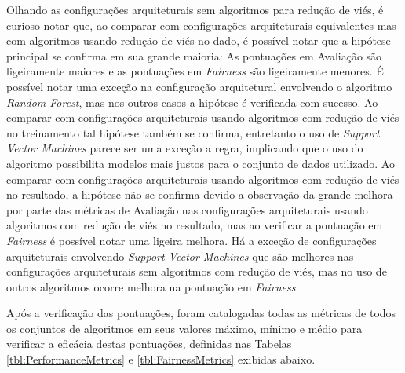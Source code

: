 \documentclass[portugues]{ic-tese}
\begin{document}
Olhando as configurações arquiteturais sem algoritmos para redução de viés, é curioso notar que, ao comparar com configurações arquiteturais equivalentes mas com algoritmos usando redução de viés no dado, é possível notar que a hipótese principal se confirma em sua grande maioria: As pontuações em Avaliação são ligeiramente maiores e as pontuações em \textit{Fairness} são ligeiramente menores. É possível notar uma exceção na configuração arquitetural envolvendo o algoritmo \textit{Random Forest}, mas nos outros casos a hipótese é verificada com sucesso. Ao comparar com configurações arquiteturais usando algoritmos com redução de viés no treinamento tal hipótese também se confirma, entretanto o uso de \textit{Support Vector Machines} parece ser uma exceção a regra, implicando que o uso do algoritmo possibilita modelos mais justos para o conjunto de dados utilizado. Ao comparar com configurações arquiteturais usando algoritmos com redução de viés no resultado, a hipótese não se confirma devido a observação da grande melhora por parte das métricas de Avaliação nas configurações arquiteturais usando algoritmos com redução de viés no resultado, mas ao verificar a pontuação em \textit{Fairness} é possível notar uma ligeira melhora. Há a exceção de configurações arquiteturais envolvendo \textit{Support Vector Machines} que são melhores nas configurações arquiteturais sem algoritmos com redução de viés, mas no uso de outros algoritmos ocorre melhora na pontuação em \textit{Fairness}.

Após a verificação das pontuações, foram catalogadas todas as métricas de todos os conjuntos de algoritmos em seus valores máximo, mínimo e médio para verificar a eficácia destas pontuações, definidas nas Tabelas \ref{tbl:PerformanceMetrics} e \ref{tbl:FairnessMetrics} exibidas abaixo.
\end{document}
